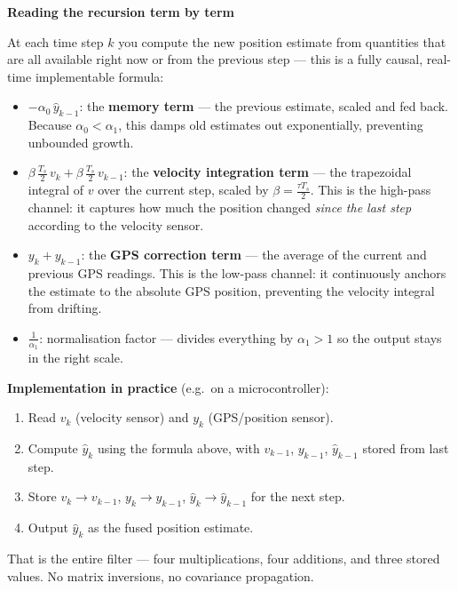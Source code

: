 \documentclass[12pt, a4paper]{article}
\begin{document}
\begin{notebox}
  \textbf{Reading the recursion term by term}

  At each time step $k$ you compute the new position estimate from
  quantities that are all available right now or from the previous step
  --- this is a fully causal, real-time implementable formula:

  \begin{itemize}[leftmargin=1.2em, itemsep=4pt]
    \item $-\alpha_0\,\hat{y}_{k-1}$: the \textbf{memory term} ---
      the previous estimate, scaled and fed back.
      Because $\alpha_0 < \alpha_1$, this damps old estimates out
      exponentially, preventing unbounded growth.

    \item $\beta\,\tfrac{T_s}{2}\,v_k + \beta\,\tfrac{T_s}{2}\,v_{k-1}$:
      the \textbf{velocity integration term} --- the trapezoidal integral
      of $v$ over the current step, scaled by $\beta = \tfrac{\tau
      T_s}{2}$.
      This is the high-pass channel: it captures how much the position
      changed \emph{since the last step} according to the velocity sensor.

    \item $y_k + y_{k-1}$: the \textbf{GPS correction term} --- the
      average of the current and previous GPS readings.
      This is the low-pass channel: it continuously anchors the estimate
      to the absolute GPS position, preventing the velocity integral from
      drifting.

    \item $\tfrac{1}{\alpha_1}$: normalisation factor --- divides
      everything by $\alpha_1 > 1$ so the output stays in the right scale.
  \end{itemize}

  \textbf{Implementation in practice} (e.g.\ on a microcontroller):
  \begin{enumerate}[leftmargin=1.6em, itemsep=2pt]
    \item Read $v_k$ (velocity sensor) and $y_k$ (GPS/position sensor).
    \item Compute $\hat{y}_k$ using the formula above,
      with $v_{k-1}$, $y_{k-1}$, $\hat{y}_{k-1}$ stored from last step.
    \item Store $v_k \to v_{k-1}$, $y_k \to y_{k-1}$,
      $\hat{y}_k \to \hat{y}_{k-1}$ for the next step.
    \item Output $\hat{y}_k$ as the fused position estimate.
  \end{enumerate}
  That is the entire filter --- four multiplications, four additions,
  and three stored values.
  No matrix inversions, no covariance propagation.
\end{notebox}
\end{document}
